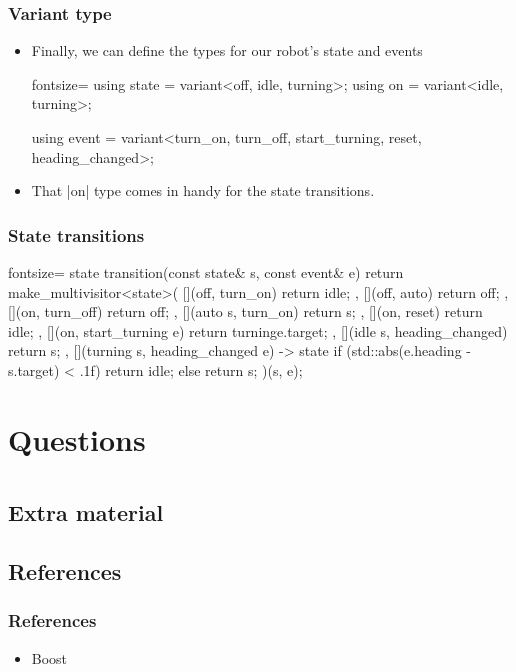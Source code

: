 \documentclass[aspectratio=169]{beamer}
\begin{document}
\begin{frame}[fragile]
  \frametitle{Variant type}
  \begin{itemize}
  \item Finally, we can define the types for our robot's state and events
  \begin{cppcode*}{fontsize=\footnotesize}
using state = variant<off, idle, turning>;
using on = variant<idle, turning>;

using event = variant<turn_on, turn_off, start_turning, reset,
                      heading_changed>;
\end{cppcode*}
  \item That \cpp|on| type comes in handy for the state transitions.
  \end{itemize}
\end{frame}

\begin{frame}[fragile]
  \frametitle{State transitions}
  \begin{cppcode*}{fontsize=\footnotesize}
state transition(const state& s, const event& e) {
  return make_multivisitor<state>(
      [](off,       turn_on)         { return idle{}; },
      [](off,       auto)            { return off{}; },
      [](on,        turn_off)        { return off{}; },
      [](auto s,    turn_on)         { return s; },
      [](on,        reset)           { return idle{}; },
      [](on,        start_turning e) { return turning{e.target}; },
      [](idle s,    heading_changed) { return s; },
      [](turning s, heading_changed e) -> state {
        if (std::abs(e.heading - s.target) < .1f) {
          return idle{};
        } else {
          return s;
        }
      })(s, e);
}
\end{cppcode*}
\end{frame}


\section{Questions}

\begin{frame}
\end{frame}


\appendix

\section{\appendixname}
\frame{\tableofcontents}

\subsection{Extra material}

\subsection{References}

\begin{frame}[fragile]
  \frametitle{References}
  \begin{itemize}
  \item Boost
  \end{itemize}
\end{frame}
\end{document}
